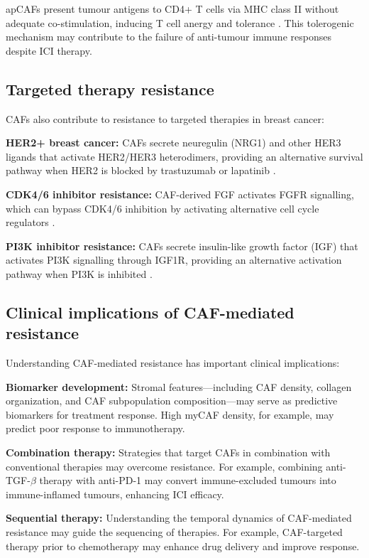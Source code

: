 apCAFs present tumour antigens to CD4+ T cells via MHC class II without adequate co-stimulation, inducing T cell anergy and tolerance \citep{erve2024}. This tolerogenic mechanism may contribute to the failure of anti-tumour immune responses despite ICI therapy.

\subsection{Targeted therapy resistance}

CAFs also contribute to resistance to targeted therapies in breast cancer:

\textbf{HER2+ breast cancer:} CAFs secrete neuregulin (NRG1) and other HER3 ligands that activate HER2/HER3 heterodimers, providing an alternative survival pathway when HER2 is blocked by trastuzumab or lapatinib \citep{seth2021}.

\textbf{CDK4/6 inhibitor resistance:} CAF-derived FGF activates FGFR signalling, which can bypass CDK4/6 inhibition by activating alternative cell cycle regulators \citep{seth2021}.

\textbf{PI3K inhibitor resistance:} CAFs secrete insulin-like growth factor (IGF) that activates PI3K signalling through IGF1R, providing an alternative activation pathway when PI3K is inhibited \citep{seth2021}.

\subsection{Clinical implications of CAF-mediated resistance}

Understanding CAF-mediated resistance has important clinical implications:

\textbf{Biomarker development:} Stromal features---including CAF density, collagen organization, and CAF subpopulation composition---may serve as predictive biomarkers for treatment response. High myCAF density, for example, may predict poor response to immunotherapy.

\textbf{Combination therapy:} Strategies that target CAFs in combination with conventional therapies may overcome resistance. For example, combining anti-TGF-$\beta$ therapy with anti-PD-1 may convert immune-excluded tumours into immune-inflamed tumours, enhancing ICI efficacy.

\textbf{Sequential therapy:} Understanding the temporal dynamics of CAF-mediated resistance may guide the sequencing of therapies. For example, CAF-targeted therapy prior to chemotherapy may enhance drug delivery and improve response.
